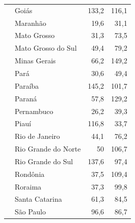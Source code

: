\begin{table}[!htbp]
\begin{tabular}{llrr}
                      & Goiás                                & 133,2                      & 116,1                      \\
                      & Maranhão                             & 19,6                       & 31,1                       \\
                      & Mato Grosso                          & 31,3                       & 73,5                       \\
                      & Mato Grosso do Sul                   & 49,4                       & 79,2                       \\
                      & Minas Gerais                         & 66,2                       & 149,2                      \\
                      & Pará                                 & 30,6                       & 49,4                       \\
                      & Paraíba                              & 145,2                      & 101,7                      \\
                      & Paraná                               & 57,8                       & 129,2                      \\
                      & Pernambuco                           & 26,2                       & 39,3                       \\
                      & Piauí                                & 116,8                      & 33,7                       \\
                      & Rio de Janeiro                       & 44,1                       & 76,2                       \\
                      & Rio Grande do Norte                  & 50                         & 106,7                      \\
                      & Rio Grande do Sul                    & 137,6                      & 97,4                       \\
                      & Rondônia                             & 37,5                       & 109,4                      \\
                      & Roraima                              & 37,3                       & 99,8                       \\
                      & Santa Catarina                       & 61,3                       & 84,5                       \\
                      & São Paulo                            & 96,6                       & 86,7                       \\

\end{tabular}
\end{table}
